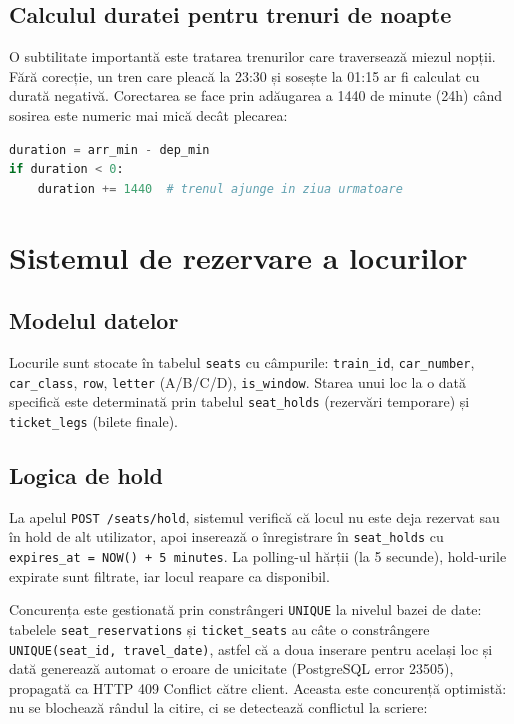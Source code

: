 \documentclass[12pt,a4paper]{report}
\begin{document}
\subsection{Calculul duratei pentru trenuri de noapte}

O subtilitate importantă este tratarea trenurilor care traversează miezul nopții. Fără corecție, un tren care pleacă la 23:30 și sosește la 01:15 ar fi calculat cu durată negativă. Corectarea se face prin adăugarea a 1440 de minute (24h) când sosirea este numeric mai mică decât plecarea:

\begin{lstlisting}[language=Python, caption=Corectie durata tren de noapte]
duration = arr_min - dep_min
if duration < 0:
    duration += 1440  # trenul ajunge in ziua urmatoare
\end{lstlisting}

\section{Sistemul de rezervare a locurilor}

\subsection{Modelul datelor}

Locurile sunt stocate în tabelul \texttt{seats} cu câmpurile: \texttt{train\_id}, \texttt{car\_number}, \texttt{car\_class}, \texttt{row}, \texttt{letter} (A/B/C/D), \texttt{is\_window}. Starea unui loc la o dată specifică este determinată prin tabelul \texttt{seat\_holds} (rezervări temporare) și \texttt{ticket\_legs} (bilete finale).

\subsection{Logica de hold}

La apelul \texttt{POST /seats/hold}, sistemul verifică că locul nu este deja rezervat sau în hold de alt utilizator, apoi inserează o înregistrare în \texttt{seat\_holds} cu \texttt{expires\_at = NOW() + 5 minutes}. La polling-ul hărții (la 5 secunde), hold-urile expirate sunt filtrate, iar locul reapare ca disponibil.

Concurența este gestionată prin constrângeri \texttt{UNIQUE} la nivelul bazei de date: tabelele \texttt{seat\_reservations} și \texttt{ticket\_seats} au câte o constrângere \texttt{UNIQUE(seat\_id, travel\_date)}, astfel că a doua inserare pentru același loc și dată generează automat o eroare de unicitate (PostgreSQL error 23505), propagată ca HTTP 409 Conflict către client. Aceasta este concurență optimistă: nu se blochează rândul la citire, ci se detectează conflictul la scriere:
\end{document}
